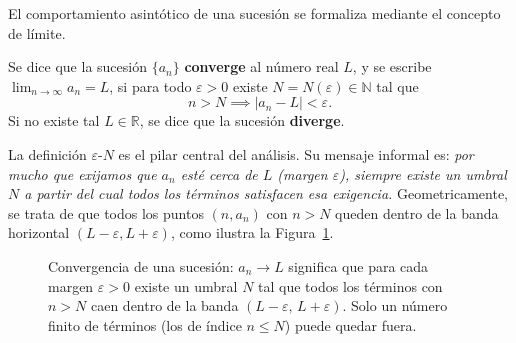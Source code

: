 El comportamiento asintótico de una sucesión se formaliza mediante el concepto de límite.

\begin{definition}
Se dice que la sucesión $\{a_n\}$ \textbf{converge} al número real $L$, y se
escribe $\lim_{n\to\infty} a_n = L$, si para todo $\varepsilon > 0$ existe
$N = N(\varepsilon) \in \mathbb{N}$ tal que
\[
  n > N \implies |a_n - L| < \varepsilon.
\]
Si no existe tal $L \in \mathbb{R}$, se dice que la sucesión \textbf{diverge}.
\end{definition}

\begin{rem}
La definición $\varepsilon$-$N$ es el pilar central del análisis. Su mensaje
informal es: \emph{por mucho que exijamos que $a_n$ esté cerca de $L$ (margen
$\varepsilon$), siempre existe un umbral $N$ a partir del cual todos los
términos satisfacen esa exigencia.} Geometricamente, se trata de que todos
los puntos $(n, a_n)$ con $n > N$ queden dentro de la banda horizontal
$(L-\varepsilon, L+\varepsilon)$, como ilustra la
Figura~\ref{fig:sucesion_convergente_banda}.
\end{rem}

\begin{figure}[!htbp]
\centering
{}
\caption{Convergencia de una sucesión: $a_n\to L$ significa que para cada
margen $\varepsilon>0$ existe un umbral $N$ tal que todos los términos con
$n>N$ caen dentro de la banda $(L-\varepsilon,\,L+\varepsilon)$. Solo un
número finito de términos (los de índice $n\leq N$) puede quedar fuera.}
\label{fig:sucesion_convergente_banda}
\end{figure}


